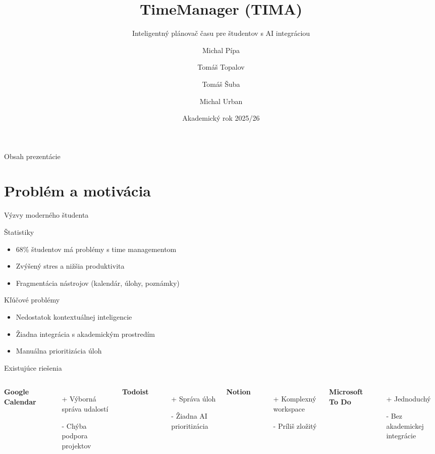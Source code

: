 \documentclass{beamer}
\title{TimeManager (TIMA)}
\subtitle{Inteligentný plánovač času pre študentov s AI integráciou}
\author[Pípa, Topalov, Šuba, Urban]{Michal Pípa \and Tomáš Topalov \and Tomáš Šuba \and Michal Urban}
\institute{FIIT STU Bratislava}
\date{Akademický rok 2025/26}
\begin{document}
\frame{\titlepage}

\begin{frame}{Obsah prezentácie}
\tableofcontents
\end{frame}

\section{Problém a motivácia}

\begin{frame}{Výzvy moderného študenta}
\begin{block}{Štatistiky}
\begin{itemize}
\item 68\% študentov má problémy s time managementom
\item Zvýšený stres a nižšia produktivita
\item Fragmentácia nástrojov (kalendár, úlohy, poznámky)
\end{itemize}
\end{block}

\begin{alertblock}{Kľúčové problémy}
\begin{itemize}
\item Nedostatok kontextuálnej inteligencie
\item Žiadna integrácia s akademickým prostredím
\item Manuálna prioritizácia úloh
\end{itemize}
\end{alertblock}
\end{frame}

\begin{frame}{Existujúce riešenia}
\begin{columns}
\textbf{Google Calendar}
\begin{itemize}
\item[+] Výborná správa udalostí
\item[-] Chýba podpora projektov
\end{itemize}

\textbf{Todoist}
\begin{itemize}
\item[+] Správa úloh
\item[-] Žiadna AI prioritizácia
\end{itemize}

\textbf{Notion}
\begin{itemize}
\item[+] Komplexný workspace
\item[-] Príliš zložitý
\end{itemize}

\textbf{Microsoft To Do}
\begin{itemize}
\item[+] Jednoduchý
\item[-] Bez akademickej integrácie
\end{itemize}
\end{columns}
\end{frame}
\end{document}
